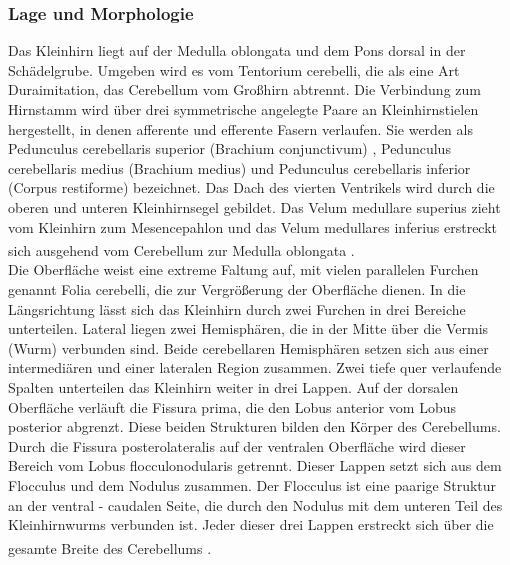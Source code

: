 \documentclass[12pt,a4paper,pdftex]{article}
\begin{document}
\subsubsection{Lage und Morphologie}
Das Kleinhirn liegt auf der Medulla oblongata und dem Pons dorsal in der Schädelgrube. Umgeben wird es vom Tentorium cerebelli, die als eine Art Duraimitation, das Cerebellum vom Großhirn abtrennt. Die Verbindung zum Hirnstamm wird über drei symmetrische angelegte Paare an Kleinhirnstielen  hergestellt, in denen afferente und efferente Fasern verlaufen. Sie werden als Pedunculus cerebellaris superior (Brachium conjunctivum) , Pedunculus cerebellaris medius (Brachium medius)  und Pedunculus cerebellaris inferior (Corpus restiforme)  bezeichnet.  Das Dach des vierten Ventrikels wird durch die oberen und unteren Kleinhirnsegel gebildet. Das Velum medullare superius zieht vom Kleinhirn zum Mesencepahlon und das Velum medullares inferius erstreckt sich ausgehend vom Cerebellum zur Medulla oblongata \textsuperscript{\cite[7]{trepel2011neuroanatomie}}. \\
Die Oberfläche weist eine extreme Faltung auf, mit vielen parallelen Furchen genannt Folia cerebelli, die zur Vergrößerung der Oberfläche dienen. In die Längsrichtung lässt sich das Kleinhirn durch zwei Furchen in drei Bereiche unterteilen. Lateral liegen zwei Hemisphären, die in der Mitte über die Vermis (Wurm)  verbunden sind. Beide cerebellaren Hemisphären setzen sich aus einer intermediären und einer lateralen Region zusammen. Zwei tiefe quer verlaufende Spalten unterteilen das Kleinhirn weiter in drei Lappen. Auf der dorsalen Oberfläche verläuft die Fissura prima, die den Lobus anterior vom Lobus posterior abgrenzt. Diese beiden Strukturen bilden den Körper des Cerebellums. Durch die Fissura posterolateralis auf der ventralen Oberfläche wird dieser Bereich vom Lobus flocculonodularis getrennt. Dieser Lappen setzt sich aus dem Flocculus  und dem Nodulus  zusammen. Der Flocculus ist eine paarige Struktur an der ventral - caudalen Seite, die durch den Nodulus mit dem unteren Teil des Kleinhirnwurms verbunden ist. Jeder dieser drei Lappen erstreckt sich über die gesamte Breite des Cerebellums \textsuperscript{\cite[42]{kandel2013principles}}.  \\
\end{document}
